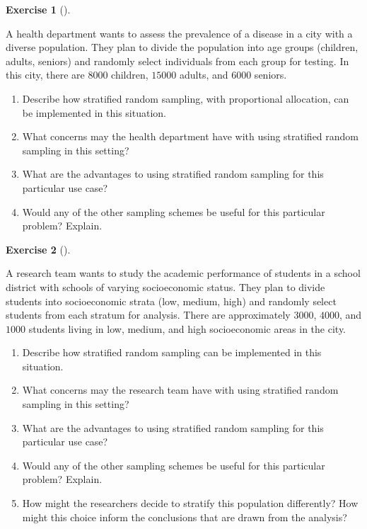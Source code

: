 \documentclass[
  letterpaper,
  DIV=11,
  numbers=noendperiod]{scrreprt}
\providecommand{\tightlist}{%
  \setlength{\itemsep}{0pt}\setlength{\parskip}{0pt}}\usepackage{longtable,booktabs,array}
\theoremstyle{definition}
\newtheorem{exercise}{Exercise}[chapter]
\theoremstyle{definition}
\theoremstyle{definition}
\theoremstyle{remark}
\begin{document}
\begin{exercise}[]\protect\hypertarget{exr-10.14}{}\label{exr-10.14}

A health department wants to assess the prevalence of a disease in a
city with a diverse population. They plan to divide the population into
age groups (children, adults, seniors) and randomly select individuals
from each group for testing. In this city, there are \(8000\) children,
\(15000\) adults, and \(6000\) seniors.

\begin{enumerate}
\def\labelenumi{\alph{enumi}.}
\tightlist
\item
  Describe how stratified random sampling, with proportional allocation,
  can be implemented in this situation.
\item
  What concerns may the health department have with using stratified
  random sampling in this setting?
\item
  What are the advantages to using stratified random sampling for this
  particular use case?
\item
  Would any of the other sampling schemes be useful for this particular
  problem? Explain.
\end{enumerate}

\end{exercise}

\begin{exercise}[]\protect\hypertarget{exr-10.15}{}\label{exr-10.15}

A research team wants to study the academic performance of students in a
school district with schools of varying socioeconomic status. They plan
to divide students into socioeconomic strata (low, medium, high) and
randomly select students from each stratum for analysis. There are
approximately \(3000\), \(4000\), and \(1000\) students living in low,
medium, and high socioeconomic areas in the city.

\begin{enumerate}
\def\labelenumi{\alph{enumi}.}
\tightlist
\item
  Describe how stratified random sampling can be implemented in this
  situation.
\item
  What concerns may the research team have with using stratified random
  sampling in this setting?
\item
  What are the advantages to using stratified random sampling for this
  particular use case?
\item
  Would any of the other sampling schemes be useful for this particular
  problem? Explain.
\item
  How might the researchers decide to stratify this population
  differently? How might this choice inform the conclusions that are
  drawn from the analysis?
\end{enumerate}

\end{exercise}
\end{document}
